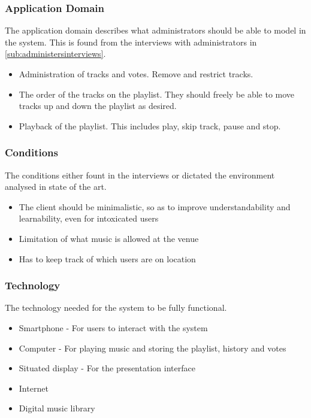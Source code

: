 \subsubsection{Application Domain}
The application domain describes what administrators should be able to model in the system. This is found from the interviews with administrators in \cref{sub:administersinterviews}.
\begin{itemize}
    \item Administration of tracks and votes. Remove and restrict tracks.
    \item The order of the tracks on the playlist. They should freely be able to move tracks up and down the playlist as desired.
    \item Playback of the playlist. This includes play, skip track, pause and stop.
\end{itemize}

\subsubsection{Conditions}
The conditions either fount in the interviews or dictated the environment analysed in state of the art.
\begin{itemize}
  \item The client should be minimalistic, so as to improve understandability and learnability, even for intoxicated users
  \item Limitation of what music is allowed at the venue
  \item Has to keep track of which users are on location
\end{itemize}

\subsubsection{Technology}
The technology needed for the system to be fully functional.
\begin{itemize}
    \item Smartphone - For users to interact with the system
    \item Computer - For playing music and storing the playlist, history and votes
		\item Situated display - For the presentation interface
    \item Internet
    \item Digital music library
\end{itemize}

